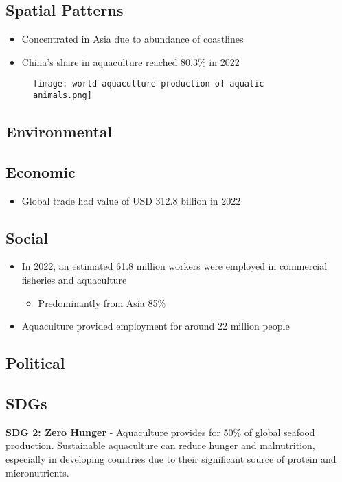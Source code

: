 	\subsection{Spatial Patterns}
		\begin{itemize}
			\item Concentrated in Asia due to abundance of coastlines
			\item China's share in aquaculture reached 80.3\% in 2022
		\end{itemize}
		
		\begin{figure}[H]
			\centering
			\texttt{[image: world aquaculture production of aquatic animals.png]}
		\end{figure}

	\subsection{Environmental}

	\subsection{Economic}
	\begin{itemize}
		\item Global trade had value of USD 312.8 billion in 2022
	\end{itemize}

	\subsection{Social}
		\begin{itemize}
			\item In 2022, an estimated 61.8 million workers were employed in commercial fisheries and aquaculture
			\begin{itemize}
				\item Predominantly from Asia 85\%
			\end{itemize} 
			\item Aquaculture provided employment for around 22 million people
		\end{itemize}

	\subsection{Political}

	\subsection{SDGs}
		\textbf{SDG 2: Zero Hunger} - Aquaculture provides for 50\% of global seafood production. Sustainable aquaculture can reduce hunger and malnutrition, especially in developing countries due to their significant source of protein and micronutrients.

